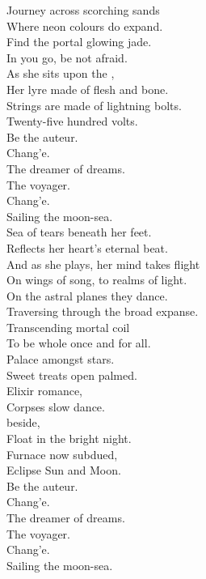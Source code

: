 Journey across scorching sands \\
Where neon colours do expand. \\
Find the portal glowing jade. \\
In you go, be not afraid. \\
As she sits upon the , \\
Her lyre made of flesh and bone. \\
Strings are made of lightning bolts. \\
Twenty-five hundred volts. \\

Be the auteur. \\
Chang'e. \\
The dreamer of dreams. \\
The voyager. \\
Chang'e. \\
Sailing the moon-sea. \\

Sea of tears beneath her feet. \\
Reflects her heart's eternal beat. \\
And as she plays, her mind takes flight \\
On wings of song, to realms of light. \\
On the astral planes they dance. \\
Traversing through the broad expanse. \\
Transcending mortal coil \\
To be whole once and for all. \\

Palace amongst stars. \\
Sweet treats open palmed. \\
Elixir romance, \\
Corpses slow dance. \\
 beside, \\
Float in the bright night. \\
Furnace now subdued, \\
Eclipse Sun and Moon. \\

Be the auteur. \\
Chang'e. \\
The dreamer of dreams. \\
The voyager. \\
Chang'e. \\
Sailing the moon-sea. \\

